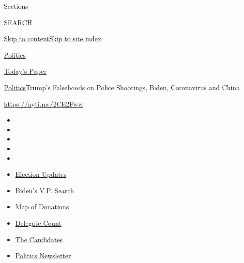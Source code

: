 Sections

SEARCH

\protect\hyperlink{site-content}{Skip to
content}\protect\hyperlink{site-index}{Skip to site index}

\href{https://www.nytimes3xbfgragh.onion/section/politics}{Politics}

\href{https://myaccount.nytimes3xbfgragh.onion/auth/login?response_type=cookie\&client_id=vi}{}

\href{https://www.nytimes3xbfgragh.onion/section/todayspaper}{Today's
Paper}

\href{/section/politics}{Politics}\textbar{}Trump's Falsehoods on Police
Shootings, Biden, Coronavirus and China

\url{https://nyti.ms/2CE2Fww}

\begin{itemize}
\item
\item
\item
\item
\item
\end{itemize}

\begin{itemize}
\item
  \href{https://www.nytimes3xbfgragh.onion/2020/08/03/us/elections/biden-vs-trump.html?action=click\&pgtype=Article\&state=default\&region=TOP_BANNER\&context=storylines_menu}{Election
  Updates}
\item
  \href{https://www.nytimes3xbfgragh.onion/article/biden-vice-president-2020.html?action=click\&pgtype=Article\&state=default\&region=TOP_BANNER\&context=storylines_menu}{Biden's
  V.P. Search}
\item
  \href{https://www.nytimes3xbfgragh.onion/interactive/2020/07/24/us/politics/trump-biden-campaign-donors.html?action=click\&pgtype=Article\&state=default\&region=TOP_BANNER\&context=storylines_menu}{Map
  of Donations}
\item
  \href{https://www.nytimes3xbfgragh.onion/interactive/2020/us/elections/delegate-count-primary-results.html?action=click\&pgtype=Article\&state=default\&region=TOP_BANNER\&context=storylines_menu}{Delegate
  Count}
\item
  \href{https://www.nytimes3xbfgragh.onion/interactive/2019/us/politics/2020-presidential-candidates.html?action=click\&pgtype=Article\&state=default\&region=TOP_BANNER\&context=storylines_menu}{The
  Candidates}
\item
  \href{https://www.nytimes3xbfgragh.onion/newsletters/politics?action=click\&pgtype=Article\&state=default\&region=TOP_BANNER\&context=storylines_menu}{Politics
  Newsletter}
\end{itemize}

